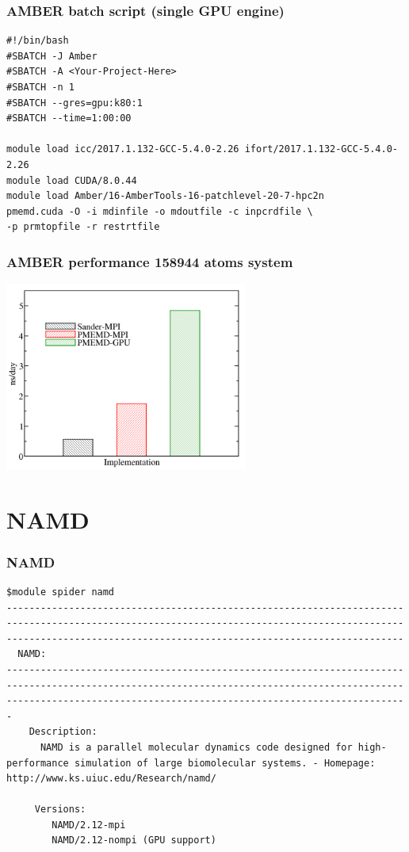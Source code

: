 \begin{frame}[fragile]
	\frametitle{AMBER batch script (single GPU engine)}
        \begin{verbatim}             
#!/bin/bash
#SBATCH -J Amber
#SBATCH -A <Your-Project-Here>
#SBATCH -n 1
#SBATCH --gres=gpu:k80:1
#SBATCH --time=1:00:00

module load icc/2017.1.132-GCC-5.4.0-2.26 ifort/2017.1.132-GCC-5.4.0-2.26
module load CUDA/8.0.44
module load Amber/16-AmberTools-16-patchlevel-20-7-hpc2n
pmemd.cuda -O -i mdinfile -o mdoutfile -c inpcrdfile \
-p prmtopfile -r restrtfile
        \end{verbatim}

\end{frame}

\begin{frame}
	\frametitle{AMBER performance 158944 atoms system}
        \begin{center}
		\includegraphics[width=8cm]{images/profiling_amber.png}
        \end{center}
\end{frame}

\section{NAMD}


\begin{frame}[fragile]
	\frametitle{NAMD}
{\small 
        \begin{verbatim}             
$module spider namd
------------------------------------------------------------------------------------------------------------------------------------------------------------------------------------------------------------------
  NAMD:
-------------------------------------------------------------------------------------------------------------------------------------------------------------------------------------------------------------------
    Description:
      NAMD is a parallel molecular dynamics code designed for high-performance simulation of large biomolecular systems. - Homepage: http://www.ks.uiuc.edu/Research/namd/ 

     Versions:
        NAMD/2.12-mpi
        NAMD/2.12-nompi (GPU support)
        \end{verbatim}
}
\end{frame}

